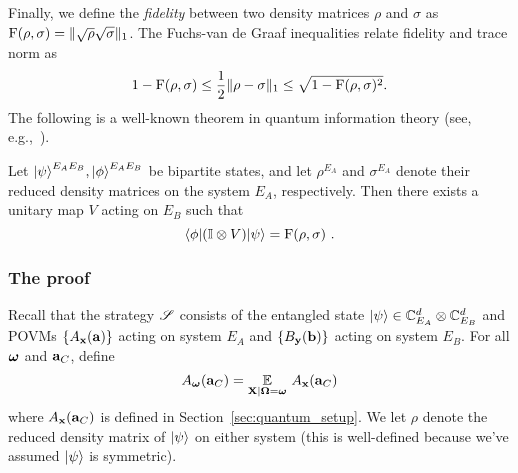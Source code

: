 Finally, we define the \emph{fidelity} between two density matrices $\rho$ and $\sigma$ as $\mathrm{F}(\rho,\sigma) = \| \sqrt{\rho} \sqrt{\sigma} \|_1$. The Fuchs-van de Graaf inequalities relate fidelity and trace norm as
\begin{equation}\label{eq:fuchs-graaf}
1 - \mathrm{F}(\rho,\sigma) \leq \frac{1}{2} \| \rho - \sigma \|_1 \leq \sqrt{1 - \mathrm{F}(\rho,\sigma)^2}.
\end{equation}
The following is a well-known theorem in quantum information theory (see, e.g.,~\cite{wilde2013quantum}).
\begin{theorem}
\label{thm:uhlmann}
	Let ${|\psi\rangle}^{E_A E_B},{|\phi\rangle}^{E_A E_B}$ be bipartite states, and let $\rho^{E_A}$ and $\sigma^{E_A}$ denote their reduced density matrices on the system $E_A$, respectively. Then there exists a unitary map $V$ acting on $E_B$ such that
	\[
		{\langle\phi|} (\mathbb{I} \otimes V) {|\psi\rangle} = \mathrm{F}(\rho,\sigma)~.
	\]
\end{theorem}



\subsubsection{The proof}

Recall that the strategy $\mathscr{S}$ consists of the entangled state ${|\psi\rangle} \in \mathbb{C}^d_{E_A} \otimes \mathbb{C}^d_{E_B}$ and POVMs $\{A_{\mathbf{x}}(\mathbf{a}) \}$ acting on system $E_A$ and $\{B_{\mathbf{y}}(\mathbf{b}) \}$ acting on system $E_B$. For all ${\boldsymbol{\omega}}$ and $\mathbf{a}_C$, define
\[
	A_{\boldsymbol{\omega}}(\mathbf{a}_C) = \operatorname*{\mathbb{E}}_{\mathbf{X} | {\boldsymbol{\Omega}} = {\boldsymbol{\omega}}} \, A_{\mathbf{x}}(\mathbf{a}_C)
\]
where $A_{\mathbf{x}}(\mathbf{a}_C)$ is defined in Section~\ref{sec:quantum_setup}. 
We let $\rho$ denote the reduced density matrix of ${|\psi\rangle}$ on either system (this is well-defined because we've assumed ${|\psi\rangle}$ is symmetric). 

